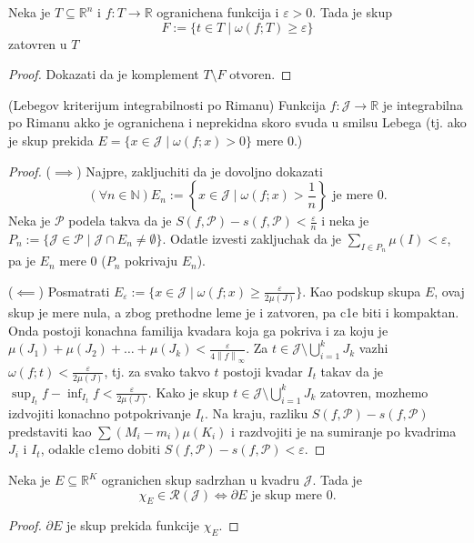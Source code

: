 \documentclass[a4paper,12pt]{article}
\newcommand{\NN}{\mathbb{N}}
\newcommand{\RR}{\mathbb{R}}
\newcommand{\eps}{\varepsilon}
\newcommand{\psj}{\subseteq}
\newcommand{\ds}{\displaystyle}
\newcommand{\norm}[1]{\left\lVert#1\right\rVert}
\begin{document}
\begin{lema}
	Neka je $T\psj \RR^n$ i $f:T \to\RR$ ogranichena funkcija i $\eps > 0$. Tada je skup
	$$F:=\{t \in T \mid \omega(f; T) \geq \eps\}$$
	zatovren u $T$
\end{lema}
\begin{proof}
	Dokazati da je komplement $T\setminus F$ otvoren.
\end{proof}

\begin{tma}(Lebegov kriterijum integrabilnosti po Rimanu)
	Funkcija $f: \mathcal J \to \RR$ je integrabilna po Rimanu akko je ogranichena i neprekidna skoro svuda u smilsu Lebega 
	(tj. ako je skup prekida \( E = \{x \in \mathcal J \mid \omega(f; x) > 0\} \) mere 0.)
\end{tma}
\begin{proof}
	($\implies$)
	Najpre, zakljuchiti da je dovoljno dokazati 
	\[ (\forall n \in \NN) E_n :=  \left\{x \in \mathcal J \mid \omega(f; x) > \frac{1}{n}\right\} \text{ je mere 0.}\] 
	Neka je $\mathcal P$ podela takva da je $S(f, \mathcal P) - s(f, \mathcal P) < \frac{\eps}{n}$ i neka je 
	\( P_n := \{\mathcal J \in \mathcal P \mid \mathcal J \cap E_n \neq \emptyset\} \).
	Odatle izvesti zakljuchak da je \( \ds{\sum_{I \in P_n} \mu(I) < \eps} \), pa je $E_n$ mere 0 ($P_n$ pokrivaju $E_n$).

	($\impliedby$)
	Posmatrati $E_\eps := \{ x\in \mathcal J \mid \omega(f; x) \geq \frac{\eps}{2\mu(J)}\}$. Kao podskup skupa $E$,
	ovaj skup je mere nula, a zbog prethodne leme je i zatvoren, pa c1e biti i kompaktan. Onda postoji konachna familija 
	kvadara koja ga pokriva i za koju je $\mu(J_1) + \mu(J_2) + \dotso + \mu(J_k) < \frac{\eps}{4\norm{f}_\infty}$.
	Za $t \in \mathcal J \setminus \bigcup_{i=1}^k J_k$ vazhi \( \omega(f; t) < \frac{\eps}{2\mu(J)}\), tj.
	za svako takvo $t$ postoji kvadar $I_t$ takav da je $\sup_{I_t}f - \inf_{I_t}f< \frac{\eps}{2\mu(J)} $.
	Kako je skup $t \in \mathcal J \setminus \bigcup_{i=1}^k J_k$ zatovren, mozhemo izdvojiti konachno potpokrivanje $I_t$.
	Na kraju, razliku $S(f, \mathcal P) - s(f, \mathcal P)$ predstaviti kao $\sum (M_i - m_i) \mu(K_i)$ i razdvojiti je 
	na sumiranje po kvadrima $J_i$ i $I_t$, odakle c1emo dobiti $S(f, \mathcal P) - s(f, \mathcal P) < \eps$.
\end{proof}

\begin{posl}
	Neka je $E\psj \RR^K$ ogranichen skup sadrzhan u kvadru $\mathcal J$. Tada je 
	\[ \chi_E \in \mathcal R (\mathcal J) \iff \partial E \text{ je skup mere 0} .\] 
\end{posl}
\begin{proof}
	$\partial E$ je skup prekida funkcije $\chi_E$.
\end{proof}
\end{document}
